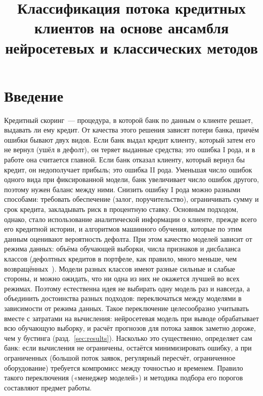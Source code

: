 \documentclass{misisarticle}
\title{Классификация потока кредитных клиентов на основе ансамбля нейросетевых и классических методов}
\begin{document}
\maketitle

\section{Введение}
\label{sec:intro}

Кредитный скоринг~--- процедура, в которой банк по данным о клиенте решает, выдавать ли ему кредит. От качества этого решения зависят потери банка, причём ошибки бывают двух видов. Если банк выдал кредит клиенту, который затем его не вернул (ушёл в дефолт), он теряет выданные средства; это ошибка I рода, и в работе она считается главной. Если банк отказал клиенту, который вернул бы кредит, он недополучает прибыль; это ошибка II рода. Уменьшая число ошибок одного вида при фиксированной модели, банк увеличивает число ошибок другого, поэтому нужен баланс между ними.
Снизить ошибку I рода можно разными способами: требовать обеспечение (залог, поручительство), ограничивать сумму и срок кредита, закладывать риск в процентную ставку. Основным подходом, однако, стало использование аналитической информации о клиенте, прежде всего его кредитной истории, и алгоритмов машинного обучения, которые по этим данным оценивают вероятность дефолта.
При этом качество моделей зависит от режима данных: объёма обучающей выборки, числа признаков и дисбаланса классов (дефолтных кредитов в портфеле, как правило, много меньше, чем возвращённых~\cite{brown2012}). Модели разных классов имеют разные сильные и слабые стороны, и можно ожидать, что ни одна из них не окажется лучшей во всех режимах. Поэтому естественна идея не выбирать одну модель раз и навсегда, а объединить достоинства разных подходов: переключаться между моделями в зависимости от режима данных. Такое переключение целесообразно учитывать вместе с затратами на вычисления: нейросетевая модель при выводе обрабатывает всю обучающую выборку, и расчёт прогнозов для потока заявок заметно дороже, чем у бустинга (разд.~\ref{sec:results}). Насколько это существенно, определяет сам банк: если вычисления не ограничены, остаётся минимизировать ошибку, а при ограниченных (большой поток заявок, регулярный пересчёт, ограниченное оборудование) требуется компромисс между точностью и временем. Правило такого переключения («менеджер моделей») и методика подбора его порогов составляют предмет работы.
\end{document}
